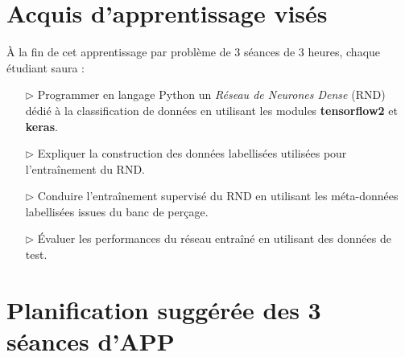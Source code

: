 \documentclass[11pt,french]{article}
\begin{document}

\renewcommand{\ttdefault}[0]{lmtt}
\newcommand{\boldtt}[1]{{\ttfamily\bfseries #1}}

\newcommand{\QtLogo}[0]{\texttt{[image: Images/QtLogo.projet]}}
\newcommand{\PyQt}[0]{\boldtt{PyQt5}}
\newcommand{\Qt}[0]{\boldtt{Qt}}

\begin{center}
\setlength{\fboxsep}{5mm}
\setlength{\fboxrule}{0.2mm}

\medskip
{}
\end{center}

\section*{Acquis d'apprentissage visés}

À la fin de cet apprentissage par problème de 3 séances de 3 heures, chaque étudiant saura :
\begin{itemize}
\item[$\rhd$] Programmer en langage Python un {\em Réseau de Neurones Dense} (RND) dédié à la classification de données
  en utilisant les modules \boldtt{tensorflow2} et \boldtt{keras}.
\item[$\rhd$] Expliquer la construction des données labellisées utilisées pour l'entraînement du RND.
\item[$\rhd$] Conduire l'entraînement supervisé du RND en utilisant les méta-données labellisées issues du banc de perçage.
\item[$\rhd$] Évaluer les performances du réseau entraîné en utilisant des données de test.
\end{itemize}

\newpage
\vspace*{-16mm}
\section*{\Large{} Planification suggérée des 3 séances d'APP}
\end{document}
